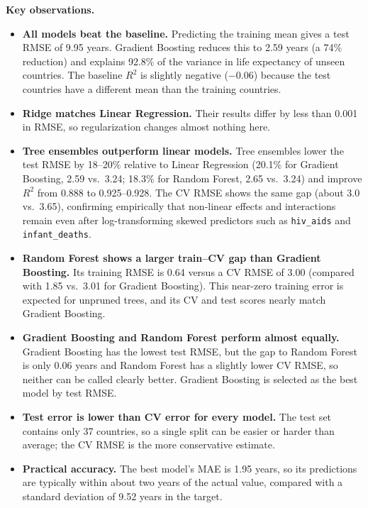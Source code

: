 \documentclass[12pt,a4paper]{article}
\begin{document}
\textbf{Key observations.}
\begin{itemize}
  \item \textbf{All models beat the baseline.} Predicting the training mean gives a test
        RMSE of 9.95 years. Gradient Boosting reduces this to 2.59 years (a 74\% reduction)
        and explains 92.8\% of the variance in life expectancy of unseen countries.
        The baseline $R^2$ is slightly negative ($-0.06$) because the test countries
        have a different mean than the training countries.
  \item \textbf{Ridge matches Linear Regression.} Their results differ by less than
        0.001 in RMSE, so regularization changes almost nothing here.
  \item \textbf{Tree ensembles outperform linear models.} Tree ensembles lower the test RMSE
        by 18--20\% relative to Linear Regression (20.1\% for Gradient Boosting, 2.59 vs.\ 3.24;
        18.3\% for Random Forest, 2.65 vs.\ 3.24) and improve $R^2$ from 0.888 to 0.925--0.928.
        The CV RMSE shows the same gap
        (about 3.0 vs.\ 3.65), confirming empirically that non-linear effects and interactions
        remain even after log-transforming skewed predictors such as \texttt{hiv\_aids} and
        \texttt{infant\_deaths}.
  \item \textbf{Random Forest shows a larger train--CV gap than Gradient Boosting.} Its training
        RMSE is 0.64 versus a CV RMSE of 3.00 (compared with 1.85 vs.\ 3.01 for Gradient Boosting).
        This near-zero training error is expected for unpruned trees, and its CV and test scores
        nearly match Gradient Boosting.
  \item \textbf{Gradient Boosting and Random Forest perform almost equally.}
        Gradient Boosting has the lowest test RMSE, but the gap to Random Forest is only 0.06 years
        and Random Forest has a slightly lower CV RMSE, so neither can be called clearly better.
        Gradient Boosting is selected as the best model by test RMSE.
  \item \textbf{Test error is lower than CV error for every model.} The test set contains only
        37 countries, so a single split can be easier or harder than average; the CV RMSE is the more
        conservative estimate.
  \item \textbf{Practical accuracy.} The best model's MAE is 1.95 years, so its predictions are
        typically within about two years of the actual value, compared with a standard
        deviation of 9.52 years in the target.
\end{itemize}
\end{document}
